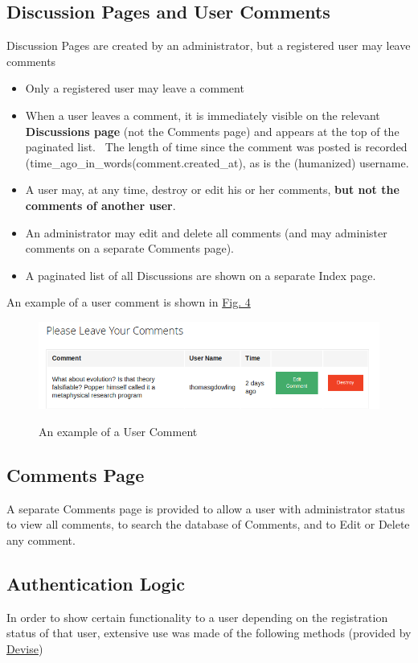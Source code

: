 \documentclass[11pt]{article}
\begin{document}
\subsection{Discussion Pages and User Comments}

Discussion Pages are created by an administrator, but a registered user
may leave comments
\begin{itemize}
\item[] Only a registered user may leave a comment
\item[] When a user leaves a comment, it is immediately visible on the relevant
\textbf{Discussions page} (not the Comments page) and appears at the top of the paginated list.
\ The length of time since the comment was posted is recorded (time\_ago\_in\_words(comment.created\_at), as is the (humanized)
username. 
\item[] A user may, at any time, destroy or edit his or her comments, \textbf{but not the comments of another user}.
\item[] An administrator may edit and delete all comments (and may administer comments on a separate Comments page).
\item[] A paginated list of all Discussions are shown on a separate Index page. 

\end{itemize}
An example of a user comment is shown in 
\hyperlink{label:figcommeg}{Fig. 4}

\begin{figure}
\includegraphics[scale=0.5]{./images/comment.png}
\label{label:commeg}
\hypertarget{label:figcommeg}{\caption{An example of a User Comment}}
\end{figure}


\subsection{Comments Page}

A separate Comments page is provided to allow a user with administrator status
to view all comments, to search the database of Comments, and to Edit or Delete any comment.
\subsection{Authentication Logic}
In order to show certain functionality to a user depending on the registration status of that
user, extensive use was made of the following methods (provided by \href{https://github.com/plataformatec/devise}{Devise})
\end{document}
